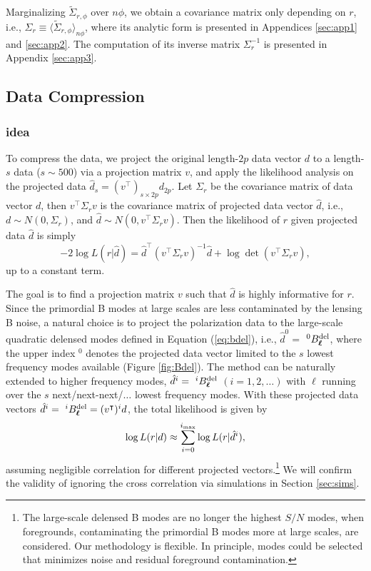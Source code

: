 \documentclass[aps, prd, reprint, nofootinbib, groupedaddress, showpacs]{revtex4-1}
\def\be{\begin{equation}}
\def\ee{\end{equation}}
\newcommand*\Bell{\ensuremath{\boldsymbol\ell}}
\begin{document}
Marginalizing $\tilde \Sigma_{r,\phi}$ over $n\phi$, we obtain a covariance matrix only depending on $r$, i.e.,
$\Sigma_r \equiv \langle \tilde \Sigma_{r,\phi} \rangle_{n\phi}$,
where its analytic form is presented in Appendices \ref{sec:app1} and \ref{sec:app2}.
The computation of its inverse matrix $\Sigma_r^{-1}$ is presented in Appendix \ref{sec:app3}.

\subsection{Data Compression}
\subsubsection{idea}
To compress the data, we project the original length-$2p$ data vector $d$ to
a length-$s$ data ($s\sim 500$) via a projection matrix $v$, and apply the likelihood analysis on the
projected data $\hat d_s = (v^\intercal)_{s\times 2p} d_{2p}$. Let $\Sigma_r$ be the covariance matrix of data vector $d$,
then $v^\intercal\Sigma_r v$ is the covariance matrix of projected data vector $\hat d$, i.e.,
$d\sim N\left(0, \Sigma_r\right)$,
and
$\hat d \sim N\left(0, v^\intercal \Sigma_r v \right)$.
Then the likelihood of $r$ given projected data $\hat d$ is simply
\be
\label{eq:projlikeli}
    -2\log L(r|\hat d)
    = \hat d^\intercal (v^\intercal\Sigma_r v)^{-1} \hat d + \log \det(v^\intercal\Sigma_r v),
\ee
up to a constant term.

The goal is to find a projection matrix $v$ such that $\hat d$ is highly informative for $r$.
Since the primordial B modes at large scales are less contaminated by the lensing B noise,
a natural choice is to project the polarization data to the large-scale quadratic delensed modes
defined in Equation (\ref{eq:bdel}),
i.e., $\hat d^0 =$ $^0B_{\Bell}^{\rm del}$, where the upper index $^0$ denotes the projected data vector
limited to the $s$ lowest frequency  modes available (Figure \ref{fig:Bdel}).
The method can be naturally extended to higher frequency modes,
$\hat d^i = \ ^iB^{\rm del}_{\Bell}$ $(i = 1,2,\dots)$
with $\Bell$ running over the $s$ next/next-next/$\dots$ lowest frequency modes.
With these projected data vectors $\hat d^i = \ ^iB^{\rm del}_{\Bell}= (v^\intercal)^i d$,
the total likelihood is given by
\be
\label{eq:totlikeli}
    \log L(r|d) \approx \sum_{i=0}^{i_{\rm max}}\log L(r|\hat d^i),
\ee
assuming negligible correlation for different projected vectors.\footnote{
The large-scale delensed B modes are no longer the highest $S/N$ modes,
when foregrounds, contaminating the primordial B modes more at large scales, are considered.
Our methodology is flexible. In principle, modes could be selected that
minimizes noise and residual foreground contamination.}
We will confirm the validity of ignoring the cross correlation via simulations in Section \ref{sec:sims}.
\end{document}

